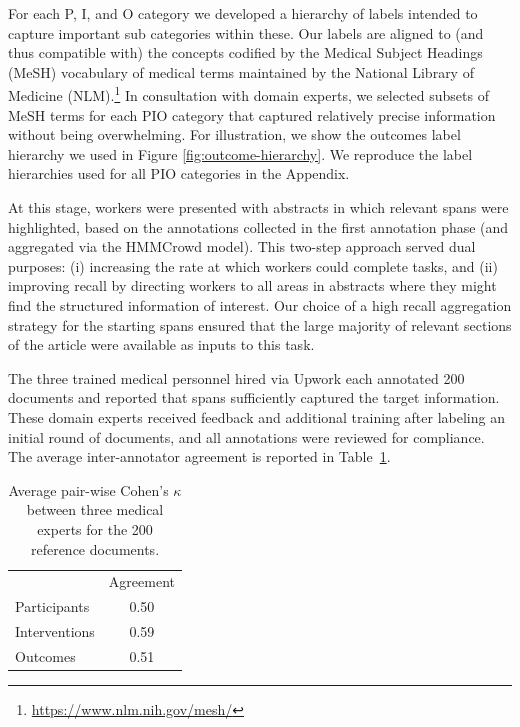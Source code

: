 \documentclass[11pt,a4paper]{article}
\begin{document}
\label{section:corpus-tokens}
For each P, I, and O category we developed a hierarchy of labels intended to capture important sub categories within these.
Our labels are aligned to (and thus compatible with) the concepts codified by the Medical Subject Headings (MeSH) vocabulary of medical terms maintained by the National Library of Medicine (NLM).\footnote{\url{https://www.nlm.nih.gov/mesh/}} In consultation with domain experts, we selected subsets of MeSH terms for each PIO category that captured relatively precise information without being overwhelming. 
For illustration, we show the outcomes label hierarchy we used in Figure \ref{fig:outcome-hierarchy}.
We reproduce the label hierarchies used for all PIO categories in the Appendix. 

At this stage, workers were presented with abstracts in which relevant spans were highlighted, based on the annotations collected in the first annotation phase (and aggregated via the HMMCrowd model).
This two-step approach served dual purposes: (i) increasing the rate at which workers could complete tasks, and (ii) improving recall by directing workers to all areas in abstracts where they might find the structured information of interest. %
Our choice of a high recall aggregation strategy for the starting spans ensured that the large majority of relevant sections of the article were available as inputs to this task.

The three trained medical personnel hired via Upwork each annotated 200 documents and reported that spans sufficiently captured the target information.
These domain experts received feedback and additional training after labeling an initial round of documents, and all annotations were reviewed for compliance.
The average inter-annotator agreement is reported in Table~\ref{tab:semantic_agreement}.

\begin{table}[h]%
    \centering
    \small
    \begin{tabular}{ l c } 
        \textbf{} & Agreement \\
        \cline{2-2}
        Participants  & 0.50 \\
        Interventions & 0.59 \\ 
        Outcomes      & 0.51 \\ 
    \end{tabular}
    \caption{Average pair-wise Cohen's $\kappa$ between three medical experts for the 200 reference documents.}
   	\label{tab:semantic_agreement}
\end{table}
\end{document}

